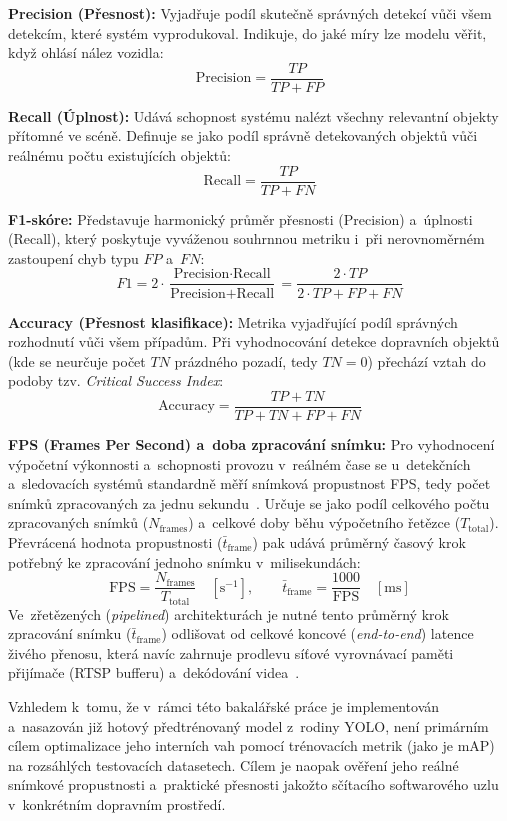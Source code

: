 \noindent\textbf{Precision (Přesnost):} Vyjadřuje podíl skutečně správných detekcí vůči všem detekcím, které systém vyprodukoval. Indikuje, do jaké míry lze modelu věřit, když ohlásí nález vozidla:
$$\text{Precision} = \frac{TP}{TP + FP}$$

\noindent\textbf{Recall (Úplnost):} Udává schopnost systému nalézt všechny relevantní objekty přítomné ve scéně. Definuje se jako podíl správně detekovaných objektů vůči reálnému počtu existujících objektů:
$$\text{Recall} = \frac{TP}{TP + FN}$$

\noindent\textbf{F1-skóre:} Představuje harmonický průměr přesnosti (Precision) a~úplnosti (Recall), který poskytuje vyváženou souhrnnou metriku i~při nerovnoměrném zastoupení chyb typu $FP$ a~$FN$:
$$F1 = 2 \cdot \frac{\text{Precision} \cdot \text{Recall}}{\text{Precision} + \text{Recall}} = \frac{2 \cdot TP}{2 \cdot TP + FP + FN}$$

\noindent\textbf{Accuracy (Přesnost klasifikace):} Metrika vyjadřující podíl správných rozhodnutí vůči všem případům. Při vyhodnocování detekce dopravních objektů (kde se neurčuje počet $TN$ prázdného pozadí, tedy $TN = 0$) přechází vztah do podoby tzv. \textit{Critical Success Index}:
$$\text{Accuracy} = \frac{TP + TN}{TP + TN + FP + FN}$$

\noindent\textbf{FPS (Frames Per Second) a~doba zpracování snímku:} Pro vyhodnocení výpočetní výkonnosti a~schopnosti provozu v~reálném čase se u~detekčních a~sledovacích systémů standardně měří snímková propustnost \acs{FPS}, tedy počet snímků zpracovaných za jednu sekundu~\cite{zhou_traffic_survey_2024, redmon_yolo_2016}. Určuje se jako podíl celkového počtu zpracovaných snímků ($N_{\text{frames}}$) a~celkové doby běhu výpočetního řetězce ($T_{\text{total}}$). Převrácená hodnota propustnosti ($\bar{t}_{\text{frame}}$) pak udává průměrný časový krok potřebný ke zpracování jednoho snímku v~milisekundách:
$$\text{FPS} = \frac{N_{\text{frames}}}{T_{\text{total}}} \quad [\text{s}^{-1}], \qquad \bar{t}_{\text{frame}} = \frac{1000}{\text{FPS}} \quad [\text{ms}]$$
Ve~zřetězených (\textit{pipelined}) architekturách je nutné tento průměrný krok zpracování snímku ($\bar{t}_{\text{frame}}$) odlišovat od celkové koncové (\textit{end-to-end}) latence živého přenosu, která navíc zahrnuje prodlevu síťové vyrovnávací paměti přijímače (\acs{RTSP} bufferu) a~dekódování videa~\cite{gstreamer_docs}.

Vzhledem k~tomu, že v~rámci této bakalářské práce je implementován a~nasazován již hotový předtrénovaný model z~rodiny YOLO, není primárním cílem optimalizace jeho interních vah pomocí trénovacích metrik (jako je $\text{mAP}$) na rozsáhlých testovacích datasetech. Cílem je naopak ověření jeho reálné snímkové propustnosti a~praktické přesnosti jakožto sčítacího softwarového uzlu v~konkrétním dopravním prostředí.

